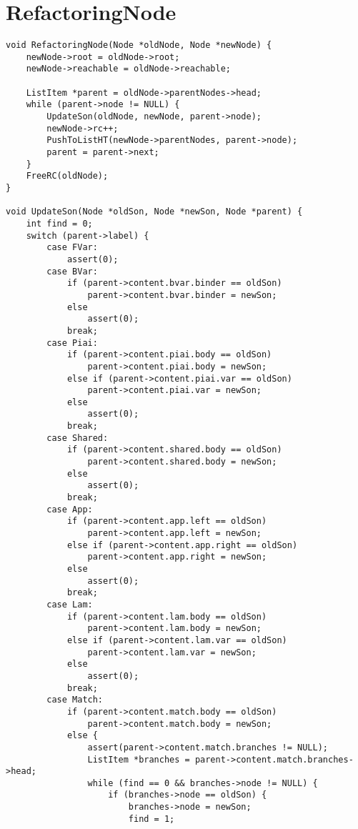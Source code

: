 \documentclass[12pt,a4paper,openright,twoside]{report}
\begin{document}
\section{RefactoringNode}
\begin{verbatim}
void RefactoringNode(Node *oldNode, Node *newNode) {
    newNode->root = oldNode->root;
    newNode->reachable = oldNode->reachable;

    ListItem *parent = oldNode->parentNodes->head;
    while (parent->node != NULL) {
        UpdateSon(oldNode, newNode, parent->node);
        newNode->rc++;
        PushToListHT(newNode->parentNodes, parent->node);
        parent = parent->next;
    }
    FreeRC(oldNode);
}

void UpdateSon(Node *oldSon, Node *newSon, Node *parent) {
    int find = 0;
    switch (parent->label) {
        case FVar:
            assert(0);
        case BVar:
            if (parent->content.bvar.binder == oldSon)
                parent->content.bvar.binder = newSon;
            else
                assert(0);
            break;
        case Piai:
            if (parent->content.piai.body == oldSon)
                parent->content.piai.body = newSon;
            else if (parent->content.piai.var == oldSon)
                parent->content.piai.var = newSon;
            else
                assert(0);
            break;
        case Shared:
            if (parent->content.shared.body == oldSon)
                parent->content.shared.body = newSon;
            else
                assert(0);
            break;
        case App:
            if (parent->content.app.left == oldSon)
                parent->content.app.left = newSon;
            else if (parent->content.app.right == oldSon)
                parent->content.app.right = newSon;
            else
                assert(0);
            break;
        case Lam:
            if (parent->content.lam.body == oldSon)
                parent->content.lam.body = newSon;
            else if (parent->content.lam.var == oldSon)
                parent->content.lam.var = newSon;
            else
                assert(0);
            break;
        case Match:
            if (parent->content.match.body == oldSon)
                parent->content.match.body = newSon;
            else {
                assert(parent->content.match.branches != NULL);
                ListItem *branches = parent->content.match.branches->head;
                while (find == 0 && branches->node != NULL) {
                    if (branches->node == oldSon) {
                        branches->node = newSon;
                        find = 1;

\end{verbatim}
\end{document}
